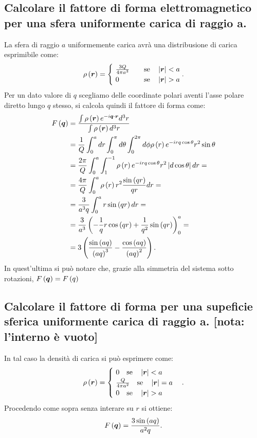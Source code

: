 \subsection[]{Calcolare il fattore di forma elettromagnetico per una sfera uniformente carica di raggio a.}
\label{sec:3.b.17}
La sfera di raggio $a$ uniformemente carica avrà una distribusione di carica esprimibile come:
\begin{align*}
	\rho\left( \boldsymbol{r} \right) =
	\begin{cases}
	\ \frac{3Q}{4\pi a^3} \quad &\text{se} \quad \left| \boldsymbol{r} \right| < a  \\
	\ 0  \quad  &\text{se} \quad \left| \boldsymbol{r} \right| > a \\
	\end{cases} 
.\end{align*}
Per un dato valore di $q$ scegliamo delle coordinate polari aventi l'asse polare diretto lungo $q$ stesso, si calcola quindi il fattore di forma come:
\begin{align*}
	F\left( \boldsymbol{q} \right) 	&= \frac{\int \rho\left( \boldsymbol{r} \right) e^{-i \boldsymbol{q}\cdot \boldsymbol{r}}d^3r}{\int \rho\left( \boldsymbol{r} \right) d^3r} \\
			       	&= \frac{1}{Q}\int_{0}^{a}dr\int_{0}^{\pi}d\theta \int_{0}^{2\pi} d\phi \rho\left( r \right) e^{-irq\cos\theta} r^2 \sin\theta \\
			     	&=  \frac{2\pi}{Q}\int_0^a\int_{1}^{-1} \rho\left( r \right) e^{-irq\cos\theta} r^2 \left| d\cos\theta \right| dr=\\ 
				&= \frac{4\pi}{Q} \int_0^{a} \rho\left( r \right) r^2 \frac{\sin\left( qr \right) }{qr}dr= \\
				&= \frac{3}{a^3q}\int_0^{a} r \sin\left( qr \right) dr= \\
				&= \frac{3}{a^3} \left(- \frac{1}{q} r\cos\left( qr \right) + \frac{1}{q^2} \sin \left( qr \right)  \right)_{0}^{a}= \\
				&= 3\left( \frac{\sin\left( aq \right) }{\left( aq \right)^3 } -\frac{\cos\left( aq \right) }{\left( aq \right) ^2} \right)  
.\end{align*}
In quest'ultima si può notare che, grazie alla simmetria del sistema sotto rotazioni, $F\left( \boldsymbol{q} \right) = F\left( q \right) $
\subsection[]{Calcolare il fattore di forma per una supeficie sferica uniformente carica di raggio a. [nota: l'interno è vuoto]}
\label{sec:3.b.18}
In tal caso la densità di carica si può esprimere come:
\begin{align*}
	\rho\left( \boldsymbol{r} \right) =
	\begin{cases}
		\ 0 \quad \text{se} \quad  \left| \boldsymbol{r} \right| < a\\
		\ \frac{Q}{ 4 \pi a^2} \quad \text{se} \quad \left| \boldsymbol{r} \right| = a\\
		\ 0 \quad \text{se} \quad \left| \boldsymbol{r} \right| > a
	\end{cases}
.\end{align*}
Procedendo come sopra senza interare su $r$ si ottiene:
\[
	F\left( \boldsymbol{q} \right) = \frac{3\sin\left( aq \right) }{a^2q}
.\] 

